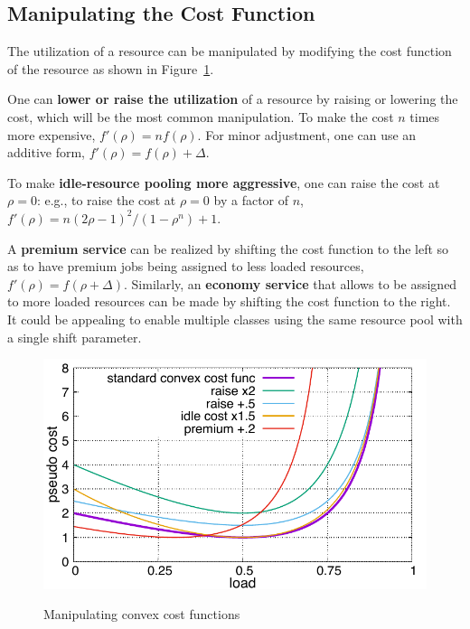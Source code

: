 \subsection{Manipulating the Cost Function}
\label{sec:variation}

The utilization of a resource can be manipulated by modifying the cost
function of the resource as shown in Figure~\ref{fig:costfunc3}.

One can {\bf lower or raise the utilization} of a resource by raising or
lowering the cost, which will be the most common manipulation.
To make the cost $n$ times more expensive, $f'(\rho) = n f(\rho)$.
For minor adjustment, one can use an additive form,
$f'(\rho) = f(\rho) + \Delta$.

To make {\bf idle-resource pooling more aggressive},
one can raise the cost at $\rho = 0$:
e.g., to raise the cost at $\rho = 0$ by a factor of $n$,
$f'(\rho) = n (2\rho - 1)^{2}/(1 - \rho^{n}) + 1$.

A {\bf premium service} can be realized by shifting the cost function
to the left so as to have premium jobs being assigned to less loaded
resources, 
$f'(\rho) = f(\rho + \Delta)$.
Similarly, an {\bf economy service} that allows to be assigned to more
loaded resources can be made by shifting the cost function to the
right.  It could be appealing to enable multiple classes using the same
resource pool with a single shift parameter.

\begin{figure}[tb]
  \begin{center}
    \includegraphics[width=1.0\columnwidth]{costfunc3.pdf}
    \vspace{-2.0ex}
    \caption{Manipulating convex cost functions}
    \label{fig:costfunc3}
  \end{center}
\end{figure}



